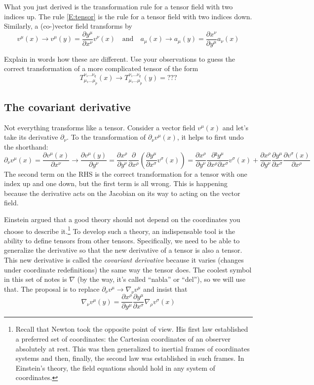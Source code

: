 What you just derived is the transformation rule for a tensor field with two indices up. The rule \eqref{E:tensor} is the rule for a tensor field with two indices down. Similarly, a (co-)vector field transforms by 
$$
v^μ(x) → v^μ(y) = \frac {∂y^μ}{∂x^ν}v^ν(x)
\quad \textrm{and}\quad
a_μ(x) → a_μ(y)=\frac {∂x^ν}{∂y^μ} a_ν(x)
$$
\begin{exercise}
Explain in words how these are different. Use your observations to guess the correct transformation of a more complicated tensor of the form
$$
T_{μ₁ ... μ_p}^{ν₁ ... ν_q} (x) → 
	T_{μ₁ ... μ_p}^{ν₁ ... ν_q} (y) = ???
$$
\end{exercise}


\subsection{The covariant derivative}

Not everything transforms like a tensor. Consider a vector field $v^μ(x)$ and let's take its derivative $∂_ν$. To the transformation of $∂_νv^μ(x)$, it helps to first undo the shorthand:
$$
∂_νv^μ(x) = \frac{∂v^μ(x)}{∂x^ν} → \frac{∂v^μ(y)}{∂y^ν} 
	= \frac {∂x^ρ}{∂y^ν}\frac{∂}{∂x^ρ}\left( \frac {∂y^μ}{∂x^σ}v^σ(x)\right) 
	= \frac {∂x^ρ}{∂y^ν}\frac {∂²y^μ}{∂x^ρ∂x^σ} v^σ(x) 
	+\frac {∂x^ρ}{∂y^ν}\frac {∂y^μ}{∂x^σ} \frac{∂v^σ(x)}{∂x^ρ}
$$
The second term on the RHS is the correct transformation for a tensor with one index up and one down, but the first term is all wrong. This is happening because the derivative acts on the Jacobian on its way to acting on the vector field. 

Einstein argued that a good theory should not depend on the coordinates you choose to describe it.\footnote{Recall that Newton took the opposite point of view. His first law established a preferred set of coordinates: the Cartesian coordinates of an observer absolutely at rest. This was then generalized to inertial frames of coordinates systems and then, finally, the second law was established in such frames. In Einstein's theory, the field equations should hold in any system of coordinates.}
To develop such a theory, an indispensable tool is the ability to define tensors from other tensors. Specifically, we need to be able to generalize the derivative so that the new derivative of a tensor is also a tensor. This new derivative is called the {\em covariant derivative} because it varies (changes under coordinate redefinitions) the same way the tensor does. The coolest symbol in this set of notes is $∇$ (by the way, it's called “nabla” or “del”), so we will use that. The proposal is to replace $∂_ν v^μ→ ∇_ν v^μ$ and insist that 
\begin{equation}\label{E:covariantD}
∇_ν v^μ(y) = \frac {∂x^ρ}{∂y^μ}\frac {∂y^μ}{∂x^σ} ∇_ρv^σ(x)
\end{equation}

